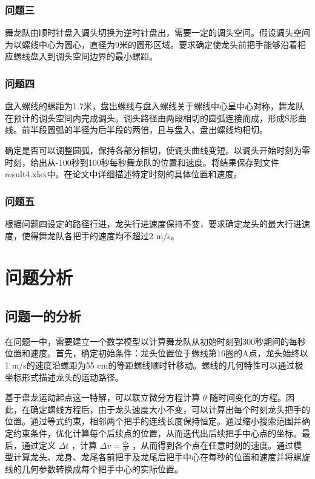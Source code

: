\documentclass[withoutpreface, bwprint]{cumcmthesis} %
\begin{document}
\subsubsection*{问题三}

舞龙队由顺时针盘入调头切换为逆时针盘出，需要一定的调头空间。假设调头空间为以螺线中心为圆心，直径为9米的圆形区域。要求确定使龙头前把手能够沿着相应螺线盘入到调头空间边界的最小螺距。

\subsubsection*{问题四}

盘入螺线的螺距为1.7米，盘出螺线与盘入螺线关于螺线中心呈中心对称，舞龙队在预计的调头空间内完成调头。调头路径由两段相切的圆弧连接而成，形成S形曲线。前半段圆弧的半径为后半段的两倍，且与盘入、盘出螺线均相切。

确定是否可以调整圆弧，保持各部分相切，使调头曲线变短。以调头开始时刻为零时刻，给出从-100秒到100秒每秒舞龙队的位置和速度。将结果保存到文件result4.xlsx中。在论文中详细描述特定时刻的具体位置和速度。

\subsubsection*{问题五}

根据问题四设定的路径行进，龙头行进速度保持不变，要求确定龙头的最大行进速度，使得舞龙队各把手的速度均不超过2 m/s。


\section{问题分析}

\subsection{问题一的分析}

在问题一中，需要建立一个数学模型以计算舞龙队从初始时刻到300秒期间的每秒位置和速度。首先，确定初始条件：龙头位置位于螺线第16圈的A点，龙头始终以1 m/s的速度沿螺距为55 cm的等距螺线顺时针移动。螺线的几何特性可以通过极坐标形式描述龙头的运动路径。

基于盘龙运动起点这一特解，可以联立微分方程计算 $ \theta $ 随时间变化的方程。因此，在确定螺线方程后，由于龙头速度大小不变，可以计算出每个时刻龙头把手的位置。通过等式约束，相邻两个把手的连线长度保持恒定。通过缩小搜索范围并确定约束条件，优化计算每个后续点的位置，从而迭代出后续把手中心点的坐标。最后，通过定义 $ \Delta t $ ，计算 $ \Delta v = \frac{ds}{dt} $ ，从而得到各个点在任意时刻的速度。通过模型计算龙头、龙身、龙尾各前把手及龙尾后把手中心在每秒的位置和速度并将螺旋线的几何参数转换成每个把手中心的实际位置。
\end{document}
